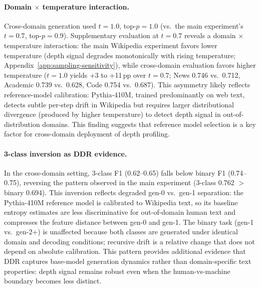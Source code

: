 \paragraph{Domain $\times$ temperature interaction.}
Cross-domain generation used $t{=}1.0$, top-$p{=}1.0$ (vs.\ the main experiment's $t{=}0.7$, top-$p{=}0.9$).
Supplementary evaluation at $t{=}0.7$ reveals a domain $\times$ temperature interaction: the main Wikipedia experiment favors lower temperature (depth signal degrades monotonically with rising temperature; Appendix~\ref{app:sampling-sensitivity}), while cross-domain evaluation favors higher temperature ($t{=}1.0$ yields +3 to +11\,pp over $t{=}0.7$; News 0.746 vs.\ 0.712, Academic 0.739 vs.\ 0.628, Code 0.754 vs.\ 0.687).
This asymmetry likely reflects reference-model calibration: Pythia-410M, trained predominantly on web text, detects subtle per-step drift in Wikipedia but requires larger distributional divergence (produced by higher temperature) to detect depth signal in out-of-distribution domains.
This finding suggests that reference model selection is a key factor for cross-domain deployment of depth profiling.

\paragraph{3-class inversion as DDR evidence.}
In the cross-domain setting, 3-class F1 (0.62--0.65) falls below binary F1 (0.74--0.75), reversing the pattern observed in the main experiment (3-class 0.762 $>$ binary 0.694).
This inversion reflects degraded gen-0 vs.\ gen-1 separation: the Pythia-410M reference model is calibrated to Wikipedia text, so its baseline entropy estimates are less discriminative for out-of-domain human text and compresses the feature distance between gen-0 and gen-1.
The binary task (gen-1 vs.\ gen-2+) is unaffected because both classes are generated under identical domain and decoding conditions; recursive drift is a relative change that does not depend on absolute calibration.
This pattern provides additional evidence that DDR captures base-model generation dynamics rather than domain-specific text properties: depth signal remains robust even when the human-vs-machine boundary becomes less distinct.
